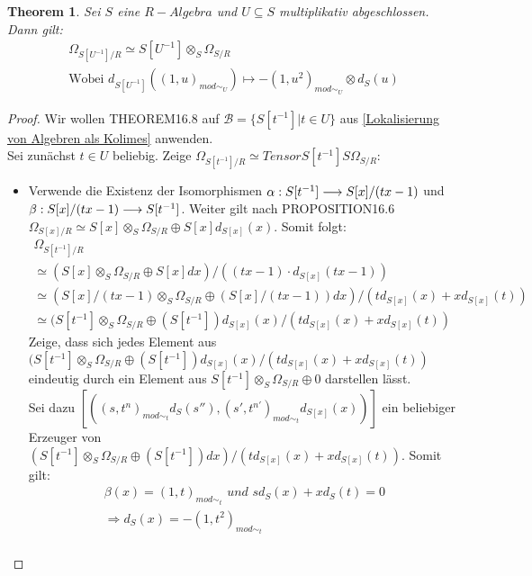 \documentclass[10pt,a4paper]{report}
\newcommand{\comment}[1]{}
\newcounter{Aussage}[chapter]
\newtheorem{theorem}[Aussage]{Theorem}
\newcommand{\functionfront}[3]{\nolinebreak{#1:#2 \longrightarrow #3}}
\newcommand{\divR}[2]{\Omega_{#1/#2}}
\newcommand{\Tensor}[3]{#1 \otimes_{#2} #3}
\newcommand{\tensor}[3]{#1 \otimes #3}
\newcommand{\lok}[2]{#1 [#2^{-1}]}
\newcommand{\loke}[3]{(#1,#2)_{mod\sim_{#3}}}
\begin{document}
\begin{theorem}\comment{\label{Lokalisierung des Kähler-Differenzials}}
Sei $S$ eine $R-Algebra$ und $U \subseteq S$ multiplikativ abgeschlossen.
Dann gilt:
\begin{gather*}
\divR{\lok{S}{U}}{R} \simeq \Tensor{\lok{S}{U}}{S}{\divR{S}{R}} \\
\text{Wobei } d_{\lok{S}{U}}(\loke{1}{u}{U}) \longmapsto -\tensor{\loke{1}{u^2}{U}}{S}{d_S(u)}
\end{gather*}
\end{theorem}
\begin{proof}
Wir wollen THEOREM16.8 \comment{\label{THEOREM16.8}} auf $\mathcal{B} = \lbrace \lok{S}{t} \vert t \in U \rbrace$ aus \cref{Lokalisierung von Algebren als Kolimes} anwenden.\\
Sei zunächst $t \in U$ beliebig. Zeige $\divR{\lok{S}{t}}{R} \simeq Tensor{\lok{S}{t}}{S}{\divR{S}{R}}$:
\begin{itemize}
\item[]
Verwende die Existenz der Isomorphismen $\functionfront{\alpha}{\lok{S}{t}}{S[x]/(tx -1)}$ und $\functionfront{\beta}{S[x]/(tx -1)}{\lok{S}{t}}$. Weiter gilt nach PROPOSITION16.6 \comment{\label{PROPOSITION16.6}}$\divR{S[x]}{R} \simeq \Tensor{S[x]}{S}{\divR{S}{R}} \oplus S[x]d_{S[x]}(x)$. Somit folgt:
\begin{gather*}
\divR{\lok{S}{t}}{R} \\
 \simeq (\Tensor{S[x]}{S}{\divR{S}{R}} \oplus S[x] dx) / ((tx - 1) \cdot d_{S[x]}(tx - 1)) \\
  \simeq (\Tensor{S[x]/(tx -1)}{S}{\divR{S}{R}} \oplus (S[x]/(tx - 1)) dx) / (td_{S[x]}(x) + xd_{S[x]}(t)) \\
   \simeq (\Tensor{\lok{S}{t}}{S}{\divR{S}{R}} \oplus (\lok{S}{t}) d_{S[x]}(x) / (td_{S[x]}(x) + xd_{S[x]}(t))
\end{gather*}
Zeige, dass sich jedes Element aus $(\Tensor{\lok{S}{t}}{S}{\divR{S}{R}} \oplus (\lok{S}{t}) d_{S[x]}(x) / (td_{S[x]}(x) + xd_{S[x]}(t))$ eindeutig durch ein Element aus $\Tensor{\lok{S}{t}}{S}{\divR{S}{R}} \oplus 0 $ darstellen lässt.\\
Sei dazu $[(\loke{s}{t^n}{t}d_{S}(s'') , \loke{s'}{t^{n'}}{t}d_{S[x]}(x) )]$ ein beliebiger Erzeuger von $(\Tensor{\lok{S}{t}}{S}{\divR{S}{R}} \oplus (\lok{S}{t}) dx) / (td_{S[x]}(x) + xd_{S[x]}(t))$. Somit gilt:
\begin{gather*}
\beta(x) = \loke{1}{t}{t} \textit{ und } sd_{S}(x) + xd_{S}(t) = 0 \\
 \Rightarrow d_{S}(x) = -\loke{1}{t^2}{t} \\

\end{gather*}
\end{itemize}
\end{proof}
\end{document}
